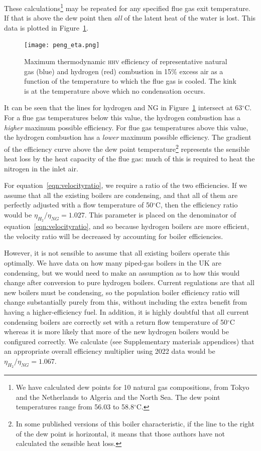 \documentclass[5p]{elsarticle} %
\begin{document}
These calculations\footnote{
We have calculated dew points for 10 natural gas compositions, from Tokyo and the Netherlands to Algeria and the North Sea. The dew point temperatures range from 56.03 to 58.8$^\circ$C\citep{Sargents_github}.
} may be repeated for any specified flue gas exit temperature. 
If that is above the dew point then \emph{all} of the latent heat of the water is lost.
This data is plotted in Figure~\ref{fig:efficiency}.

\begin{figure}[ht]
    \centering
    \texttt{[image: peng\_eta.png]}
    \caption{ Maximum thermodynamic \textsc{hhv} efficiency of representative natural gas (blue) and hydrogen (red) combustion in 15\% excess air as a function of the temperature to which the flue gas is cooled. The kink is at the temperature above which no condensation occurs. }
    \label{fig:efficiency}
\end{figure}

It can be seen that the lines for hydrogen and NG in Figure~\ref{fig:efficiency} intersect at 63$^\circ$C.
For a flue gas temperatures below this value, the hydrogen combustion has a \emph{higher} maximum possible efficiency.
For flue gas temperatures above this value, the hydrogen combustion has a \emph{lower} maximum possible efficiency.
The gradient of the efficiency curve above the dew point temperature\footnote{In some published versions of this boiler characteristic, if the line to the right of the dew point is horizontal, it means that those authors have not calculated the sensible heat loss. 
} represents the sensible heat loss by the heat capacity of the flue gas: much of this is required to heat the nitrogen in the inlet air. 

For equation~\eqref{eqn:velocityratio}, we require a ratio of the two efficiencies.
If we assume that all the existing boilers are condensing, and that all of them are perfectly adjusted with a flow temperature of 50$^\circ$C, then the efficiency ratio would be $\eta_{H_2} / \eta_{NG} = 1.027$.
This parameter is placed on the denominator of equation~\eqref{eqn:velocityratio}, and so because hydrogen boilers are more efficient, the velocity ratio will be decreased by accounting for boiler efficiencies.

However, it is not sensible to assume that all existing boilers operate this optimally.
We have data on how many piped-gas boilers in the UK are condensing, but we would need to make an assumption as to how this would change after conversion to pure hydrogen boilers. 
Current regulations\citep{GASTEC2009} are that all new boilers must be condensing, so the population boiler efficiency ratio will change substantially purely from this, without including the extra benefit from having a higher-efficiency fuel. 
In addition, it is highly doubtful that all current condensing boilers are correctly set with a return flow temperature of 50$^\circ$C whereas it is more likely that more of the new hydrogen boilers would be configured correctly. 
We calculate 
(see
Supplementary materials appendices)
that an appropriate overall efficiency multiplier using 2022 data would be $\eta_{H_2} / \eta_{NG} = 1.067$.
\end{document}
